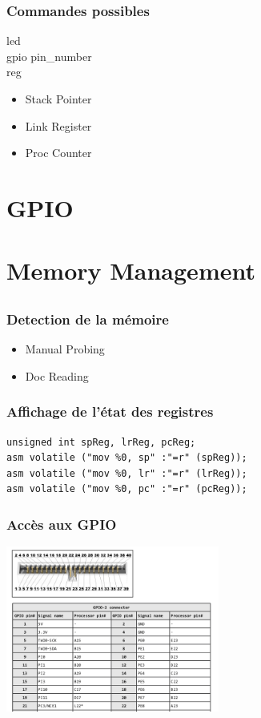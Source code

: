 \documentclass{beamer}
\begin{document}
\begin{frame}
\frametitle{Commandes possibles}
  \textsf{led} \\
  \textsf{gpio pin\_number} \\
  \textsf{reg} \\
    \begin{itemize}
    \item Stack Pointer
    \item Link Register
    \item Proc Counter
    \end{itemize}
\end{frame}

\section{GPIO}
\subsection{ }

\begin{frame}
\frametitle{ }
\end{frame}

\section{Memory Management}
\subsection{ }
\begin{frame}
  \frametitle{Detection de la mémoire}
  \begin{itemize}
  \item Manual Probing
  \item Doc Reading
  \end{itemize}
\end{frame}

\begin{frame}[fragile]
  \frametitle{Affichage de l'état des registres}
\begin{lstlisting}  
unsigned int spReg, lrReg, pcReg;    
asm volatile ("mov %0, sp" :"=r" (spReg));   
asm volatile ("mov %0, lr" :"=r" (lrReg));
asm volatile ("mov %0, pc" :"=r" (pcReg));
\end{lstlisting}
\end{frame}

\begin{frame}
\frametitle{Accès aux GPIO}
\includegraphics[width=7cm]{gpio.png}
\end{frame}
\end{document}
